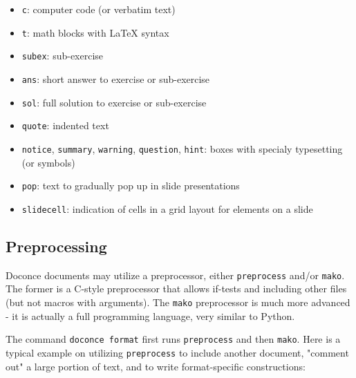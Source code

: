 \documentclass[%
oneside,                 %
final,                   %
10pt]{article}
\begin{document}
\begin{itemize}
 \item \Verb!c!: computer code (or verbatim text)

 \item \Verb!t!: math blocks with {\LaTeX} syntax

 \item \Verb!subex!: sub-exercise

 \item \Verb!ans!: short answer to exercise or sub-exercise

 \item \Verb!sol!: full solution to exercise or sub-exercise

 \item \Verb!quote!: indented text

 \item \Verb!notice!, \Verb!summary!, \Verb!warning!, \Verb!question!, \Verb!hint!: boxes with
    specialy typesetting (or symbols)

 \item \Verb!pop!: text to gradually pop up in slide presentations

 \item \Verb!slidecell!: indication of cells in a grid layout for elements on a
   slide
\end{itemize}

\noindent
\subsection{Preprocessing}

Doconce documents may utilize a preprocessor, either \Verb!preprocess! and/or
\Verb!mako!. The former is a C-style preprocessor that allows if-tests
and including other files (but not macros with arguments).
The \Verb!mako! preprocessor is much more advanced - it is actually a full
programming language, very similar to Python.

The command \Verb!doconce format! first runs \Verb!preprocess! and then \Verb!mako!.
Here is a typical example on utilizing \Verb!preprocess! to include another
document, "comment out" a large portion of text, and to write format-specific
constructions:
\end{document}
